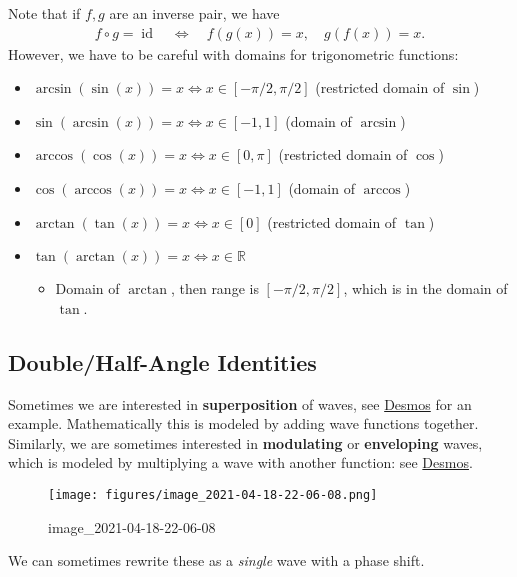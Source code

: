\begin{warnings}

Note that if \(f, g\) are an inverse pair, we have
\begin{align*}
f\circ g = \operatorname{id}\quad\iff\quad f(g(x)) = x,\quad g(f(x)) = x
.\end{align*}
However, we have to be careful with domains for trigonometric functions:

\begin{itemize}
\tightlist
\item
  \(\arcsin(\sin(x)) = x \iff x\in [-\pi/2, \pi/2]\) (restricted domain
  of \(\sin\))
\item
  \(\sin(\arcsin(x)) = x \iff x\in [-1, 1]\) (domain of \(\arcsin\))
\item
  \(\arccos(\cos(x)) = x \iff x\in [0, \pi]\) (restricted domain of
  \(\cos\))
\item
  \(\cos(\arccos(x)) = x \iff x\in [-1, 1]\) (domain of \(\arccos\))
\item
  \(\arctan(\tan(x)) = x \iff x\in [0]\) (restricted domain of \(\tan\))
\item
  \(\tan(\arctan(x)) = x \iff x\in {\mathbb{R}}\)

  \begin{itemize}
  \tightlist
  \item
    Domain of \(\arctan\), then range is \([-\pi/2, \pi/2]\), which is
    in the domain of \(\tan\).
  \end{itemize}
\end{itemize}

\end{warnings}

\hypertarget{doublehalf-angle-identities}{%
\subsection{Double/Half-Angle
Identities}\label{doublehalf-angle-identities}}

\begin{remark}

Sometimes we are interested in \textbf{superposition} of waves, see
\href{https://www.desmos.com/calculator/rhliflgwmv}{Desmos} for an
example. Mathematically this is modeled by adding wave functions
together. Similarly, we are sometimes interested in \textbf{modulating}
or \textbf{enveloping} waves, which is modeled by multiplying a wave
with another function: see
\href{https://www.desmos.com/calculator/wjgcl2xfbb}{Desmos}.

\begin{figure}
\centering
\texttt{[image: figures/image\_2021-04-18-22-06-08.png]}
\caption{image\_2021-04-18-22-06-08}
\end{figure}

We can sometimes rewrite these as a \emph{single} wave with a phase
shift.

\end{remark}

